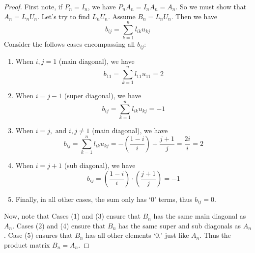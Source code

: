 \documentclass{article}
\begin{document}
\begin{proof}
    First note, if $P_{n} = I_{n}$, we have $P_{n}A_{n} = I_{n}A_{n} = A_{n}$. So we must show that $A_{n} = L_{n}U_{n}$. Let's try to find $L_{n}U_{n}$. Assume $B_{n} = L_{n}U_{n}$. Then we have
    \begin{equation*}
        b_{ij} = \sum_{k = 1}^{n}l_{ik}u_{kj}
    \end{equation*}
    Consider the follows cases encompassing all $b_{ij}$: 
    \begin{enumerate}
        \item When $i, j = 1$ (main diagonal), we have
        \begin{equation*}
            b_{11} = \sum_{k=1}^{n}l_{11}u_{11} = 2
        \end{equation*}
        \item When $i = j - 1$ (super diagonal), we have
        \begin{equation*}
            b_{ij} = \sum_{k=1}^{n}l_{ik}u_{kj} = -1
        \end{equation*}
        \item When $i = j,\text{ and }i, j \neq 1$ (main diagonal), we have
        \begin{equation*}
            b_{ij} = \sum_{k=1}^{n}l_{ik}u_{kj} = -\left(\frac{1-i}{i}\right) + \frac{j+1}{j} = \frac{2i}{i} = 2
        \end{equation*}
        \item When $i = j + 1$ (sub diagonal), we have
        \begin{equation*}
            b_{ij} = \left(\frac{1-i}{i}\right)\cdot\left(\frac{j+1}{j}\right) = -1
        \end{equation*}
        \item Finally, in all other cases, the sum only has `0' terms, thus $b_{ij} = 0$. 
    \end{enumerate}
    Now, note that Cases (1) and (3) ensure that $B_{n}$ has the same main diagonal as $A_{n}$. Cases (2) and (4) ensure that $B_{n}$ has the same super and sub diagonals as $A_{n}$. Case (5) ensures that $B_{n}$ has all other elements `0,' just like $A_{n}$. Thus the product matrix $B_{n} = A_{n}$.
\end{proof}
\end{document}

